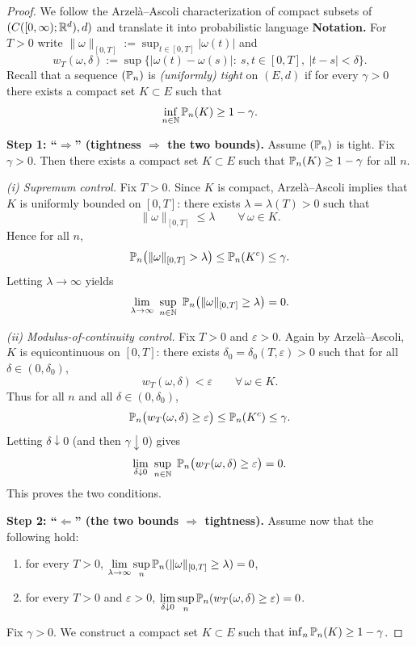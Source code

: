 \begin{proof}[Proof]
We follow the Arzel\`a--Ascoli characterization of compact subsets of
$(C([0,\infty);\mathbb{R}^d),d)$ and translate it into probabilistic language
\medskip
\noindent\textbf{Notation.}
For $T>0$ write $\|\omega\|_{[0,T]}:=\sup_{t\in[0,T]}|\omega(t)|$ and
\[
w_T(\omega,\delta):=\sup\bigl\{|\omega(t)-\omega(s)|:\ s,t\in[0,T],\ |t-s|<\delta\bigr\}.
\]
Recall that a sequence $(\mathbb{P}_n)$ is \emph{(uniformly) tight} on $(E,d)$ if for every $\gamma>0$
there exists a compact set $K\subset E$ such that
\[
\inf_{n\in\mathbb{N}}\mathbb{P}_n(K)\ge 1-\gamma.
\]

\medskip
\noindent\textbf{Step 1: ``$\Rightarrow$'' (tightness $\Rightarrow$ the two bounds).}
Assume $(\mathbb{P}_n)$ is tight. Fix $\gamma>0$. Then there exists a compact set $K\subset E$ such that
$\mathbb{P}_n(K)\ge 1-\gamma$ for all $n$.

\smallskip
\emph{(i) Supremum control.}
Fix $T>0$. Since $K$ is compact, Arzel\`a--Ascoli implies that $K$ is uniformly bounded on $[0,T]$:
there exists $\lambda=\lambda(T)>0$ such that
\[
\|\omega\|_{[0,T]}\le \lambda\qquad\forall\,\omega\in K.
\]
Hence for all $n$,
\[
\mathbb{P}_n\bigl(\|\omega\|_{[0,T]}>\lambda\bigr)\le \mathbb{P}_n(K^c)\le \gamma.
\]
Letting $\lambda\to\infty$ yields
\[
\lim_{\lambda\to\infty}\ \sup_{n\in\N}\ \Pp_n\bigl(\|\omega\|_{[0,T]}\ge \lambda\bigr)=0.
\]

\smallskip
\emph{(ii) Modulus-of-continuity control.}
Fix $T>0$ and $\varepsilon>0$. Again by Arzel\`a--Ascoli, $K$ is equicontinuous on $[0,T]$:
there exists $\delta_0=\delta_0(T,\varepsilon)>0$ such that for all $\delta\in(0,\delta_0)$,
\[
w_T(\omega,\delta)<\varepsilon\qquad\forall\,\omega\in K.
\]
Thus for all $n$ and all $\delta\in(0,\delta_0)$,
\[
\mathbb{P}_n\bigl(w_T(\omega,\delta)\ge\varepsilon\bigr)\le \mathbb{P}_n(K^c)\le \gamma.
\]
Letting $\delta\downarrow 0$ (and then $\gamma\downarrow 0$) gives
\[
\lim_{\delta\downarrow 0}\ \sup_{n\in\N}\ \Pp_n\bigl(w_T(\omega,\delta)\ge\varepsilon\bigr)=0.
\]
This proves the two conditions.

\medskip
\noindent\textbf{Step 2: ``$\Leftarrow$'' (the two bounds $\Rightarrow$ tightness).}
Assume now that the following hold:
\begin{enumerate}[label=\textnormal{(\roman*)}, leftmargin=3.2em]
\item for every $T>0$, $\displaystyle \lim_{\lambda\to\infty}\sup_{n}\mathbb{P}_n(\|\omega\|_{[0,T]}\ge\lambda)=0$,
\item for every $T>0$ and $\varepsilon>0$, $\displaystyle \lim_{\delta\downarrow 0}\sup_n\mathbb{P}_n(w_T(\omega,\delta)\ge\varepsilon)=0$.
\end{enumerate}
Fix $\gamma>0$. We construct a compact set $K\subset E$ such that $\inf_n\mathbb{P}_n(K)\ge 1-\gamma$.


\end{proof}
